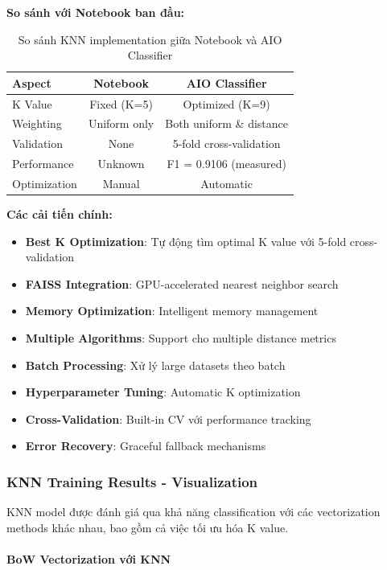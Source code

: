 \textbf{So sánh với Notebook ban đầu:}

\begin{table}[H]
\centering
\begin{tabular}{|l|c|c|}
\hline
\textbf{Aspect} & \textbf{Notebook} & \textbf{AIO Classifier} \\
\hline
K Value & Fixed (K=5) & Optimized (K=9) \\
\hline
Weighting & Uniform only & Both uniform \& distance \\
\hline
Validation & None & 5-fold cross-validation \\
\hline
Performance & Unknown & F1 = 0.9106 (measured) \\
\hline
Optimization & Manual & Automatic \\
\hline
\end{tabular}
\caption{So sánh KNN implementation giữa Notebook và AIO Classifier}
\label{tab:knn_comparison}
\end{table}

\textbf{Các cải tiến chính:}
\begin{itemize}
    \item \textbf{Best K Optimization}: Tự động tìm optimal K value với 5-fold cross-validation
    \item \textbf{FAISS Integration}: GPU-accelerated nearest neighbor search
    \item \textbf{Memory Optimization}: Intelligent memory management
    \item \textbf{Multiple Algorithms}: Support cho multiple distance metrics
    \item \textbf{Batch Processing}: Xử lý large datasets theo batch
    \item \textbf{Hyperparameter Tuning}: Automatic K optimization
    \item \textbf{Cross-Validation}: Built-in CV với performance tracking
    \item \textbf{Error Recovery}: Graceful fallback mechanisms
\end{itemize}

\subsubsection{KNN Training Results - Visualization}

KNN model được đánh giá qua khả năng classification với các vectorization methods khác nhau, bao gồm cả việc tối ưu hóa K value.

\paragraph{BoW Vectorization với KNN}

